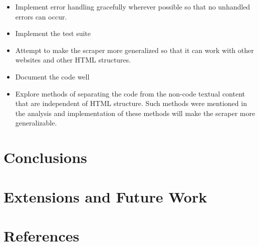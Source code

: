 \documentclass{scrreprt}
\begin{document}
\begin{itemize}
    \item Implement error handling gracefully wherever possible so that no unhandled errors can occur.
    \item Implement the test suite
    \item Attempt to make the scraper more generalized so that it can work with other websites and other HTML structures.
    \item Document the code well
    \item Explore methods of separating the code from the non-code textual content that are independent of HTML structure. Such methods were mentioned in the analysis and implementation of these methods will make the scraper more generalizable. 
\end{itemize}




\chapter{Conclusions}




\chapter{Extensions and Future Work}



\chapter{References}
\end{document}
